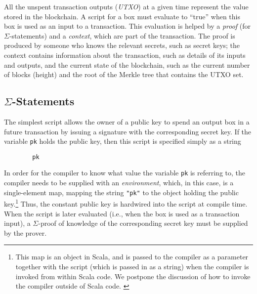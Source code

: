 \documentclass[11pt]{article}
\newcommand{\authnote}[2]{\marginpar{\parbox{\marginparwidth}{\tiny %
  \textsf{#1 {\textcolor{blue}{notes: #2}}}}}%
  \textcolor{blue}{\textbf{\dag}}}
\newcommand{\authnote}[2]{
  \textsf{#1 \textcolor{blue}{: #2}}}
\newcommand{\authnote}[2]{}
\newcommand{\lnote}[1]{{\authnote{\textcolor{orange}{Leo notes}}{#1}}}
\newcommand{\dnote}[1]{{\authnote{\textcolor{brown}{Dima notes}}{#1}}}
\begin{document}
All the unspent transaction outputs (\emph{UTXO}) at a given time represent the value stored in the blockchain. A script for a box must evaluate to ``true'' when this box is used as an input to a transaction. This evaluation is helped by a \emph{proof} (for $\Sigma$-statements) and a \emph{context}, which are part of the transaction. The proof is produced by someone who knows the relevant secrets, such as secret keys; the context contains information about the transaction, such as details of its inputs and outputs, and the current state of the blockchain, such as the current number of blocks (height) and the root of the Merkle tree that contains the UTXO set.
\dnote{This should change in future, e.g. fixed number of last headers is going to be added here (and header contains height and root hash).} \lnote{adjust this as needed}

\subsection{$\Sigma$-Statements}

\lnote{every script example here should be also in our test code exactly as written, to make sure our own paper passes our own tests. These should be edited as the language evolves.}

\lnote{If we want to show examples of the underlying syntax tree to which the language gets compiled, we can to that here, in parallel with examples in the language}

The simplest script allows the owner of a public key to spend an output box in a future transaction by issuing a signature with the corresponding secret key. If the variable \texttt{pk} holds the public key, then this script is specified simply as a string
\begin{verbatim}
        pk
\end{verbatim}

In order for the compiler to know what value the variable \texttt{pk} is referring to, the compiler needs to be supplied with an \emph{environment}, which, in this case, is a single-element map, mapping the string \texttt{"pk"} to the object holding the public key.\footnote{This map is an object in Scala, and is passed to the compiler as a parameter together with the script (which is passed in as a string) when the compiler is invoked from within Scala code. We postpone the discussion of how to invoke the compiler outside of Scala code.\lnote{we should add this discussion at some point}}
Thus, the constant public key is hardwired into the script at compile time. When the script is later evaluated (i.e., when the box is used as a transaction input), a $\Sigma$-proof of knowledge of the corresponding secret key must be supplied by the prover. 
\end{document}
